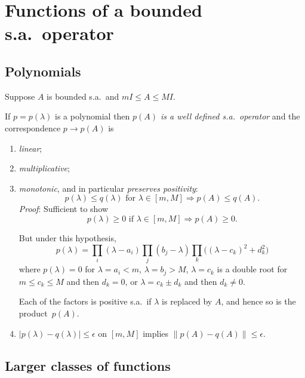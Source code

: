 \documentclass[a4paper]{amsart}
\theoremstyle{plain}
\theoremstyle{definition}
\theoremstyle{remark}
\begin{document}
\section{\textbf{Functions of a bounded s.a.\ operator}}

\subsection{Polynomials}  \label{secpo}
Suppose $ A $  is bounded s.a.\ and $ mI \leq A \leq MI $.

\medskip
If $ p = p(\lambda) $ is a polynomial then \emph{$ p(A) $ is a well defined s.a.\ operator} and the correspondence $ p \to p(A) $ is 
\begin{enumerate}

\item \emph{linear};
\item \emph{multiplicative};
\item \emph{monotonic}, and in particular \emph{preserves positivity}:
\[ p(\lambda) \leq q ( \lambda ) \text{ for } \lambda \in [m,M] \Longrightarrow p(A) \leq q(A) . \]
\emph{Proof}:  Sufficient to show 
\[ p(\lambda) \geq 0 \text{ if } \lambda \in [m,M] \Longrightarrow p(A) \geq 0 .\]

But under this hypothesis, 
\[
p( \lambda ) = \prod_i(\lambda - a_i) \prod_j(b_j- \lambda )\prod_k \big( (\lambda - c_k)^2 + d_k^2\big)
\]
where $ p(\lambda ) = 0 $ for $\lambda = a_i < m $, $\lambda = b_j > M $, $ \lambda = c_k $ is a double root for $ m \leq c_k \leq M $ and then $ d_k = 0 $, or $ \lambda = c_k \pm d_k $ and then $ d_k \neq 0 $.
 
Each of the factors is positive s.a.\ if $ \lambda $ is replaced by $ A $, and hence so is the product~$ p(A) $. 

\item $ |p(\lambda) - q(\lambda ) | \leq \epsilon $ on $ [m,M] $ implies $ \|p(A) - q(A)\| \leq \epsilon $.

\end{enumerate} 


\subsection{Larger classes of functions}
\end{document}
